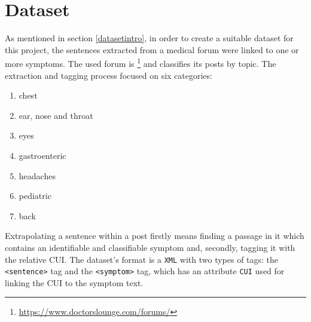\section{Dataset}
\label{sec:dataset}
As mentioned in section \ref{datasetintro}, in order to create a suitable dataset for this project, the sentences extracted from a medical forum were linked to one or more symptoms. The used forum is \footnote{\url{https://www.doctorslounge.com/forums/}} \cite{doctorslounge} and classifies its posts by topic. The extraction and tagging process focused on six categories:
\begin{enumerate}
  \item chest
  \item ear, nose and throat
  \item eyes
  \item gastroenteric
  \item headaches
  \item pediatric 
  \item back
\end{enumerate}

Extrapolating a sentence within a post firstly means finding a passage in it which contains an identifiable and classifiable symptom and, secondly, tagging it with the relative CUI. The dataset's format is a \texttt{XML} with two types of tags: the \texttt{<sentence>} tag and the \texttt{<symptom>} tag, which has an attribute \texttt{CUI} used for linking the CUI to the symptom text.
